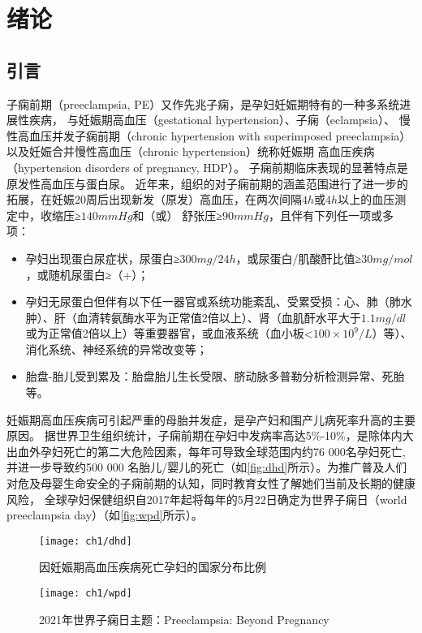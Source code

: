\chapter{绪论}

\section{引言}
子痫前期（preeclampsia, PE）又作先兆子痫，是孕妇妊娠期特有的一种多系统进展性疾病， 与妊娠期高血压（gestational hypertension）、子痫（eclampsia）、
慢性高血压并发子痫前期（chronic hypertension with superimposed preeclampsia）以及妊娠合并慢性高血压（chronic hypertension）统称妊娠期
高血压疾病（hypertension disorders of pregnancy, HDP）\cite{OAG9,HDASOM,2000s1}。
子痫前期临床表现的显著特点是原发性高血压与蛋白尿。
近年来，组织的对子痫前期的涵盖范围进行了进一步的拓展，在妊娠20周后出现新发（原发）高血压，在两次间隔$4h$或$4h$以上的血压测定中，收缩压≥$140mmHg$和（或）
舒张压≥$90mmHg$，且伴有下列任一项或多项\cite{OAG9,FIGO}：
\begin{itemize}
    \item 孕妇出现蛋白尿症状，尿蛋白≥$300mg/24h$，或尿蛋白/肌酸酐比值≥$30mg/mol$，或随机尿蛋白≥（+）；
    \item 孕妇无尿蛋白但伴有以下任一器官或系统功能紊乱、受累受损：心、肺（肺水肿）、肝（血清转氨酶水平为正常值2倍以上）、肾（血肌酐水平大于$1.1mg/dl$
    或为正常值2倍以上）等重要器官，或血液系统（血小板<$100 \times 10^{9}/L$）等）、消化系统、神经系统的异常改变等；
    \item 胎盘-胎儿受到累及：胎盘胎儿生长受限、脐动脉多普勒分析检测异常、死胎等。 
\end{itemize}

妊娠期高血压疾病可引起严重的母胎并发症，是孕产妇和围产儿病死率升高的主要原因\cite{OAG9}。
据世界卫生组织统计，子痫前期在孕妇中发病率高达5\%-10\%，是除体内大出血外孕妇死亡的第二大危险因素\cite{LCT2006}，每年可导致全球范围内约76 000名孕妇死亡,并进一步导致约500 000
名胎儿/婴儿的死亡\cite{DAM2015,LCT2006}（如\autoref{fig:dhd}所示）。为推广普及人们对危及母婴生命安全的子痫前期的认知，同时教育女性了解她们当前及长期的健康风险，
全球孕妇保健组织自2017年起将每年的5月22日确定为世界子痫日（world preeclampsia day）（如\autoref{fig:wpd}所示）。
\begin{figure}[h]
    \centering
    \texttt{[image: ch1/dhd]}
    \caption{\label{fig:dhd}因妊娠期高血压疾病死亡孕妇的国家分布比例}
\end{figure}
\begin{figure}[h]
    \centering
    \texttt{[image: ch1/wpd]}
    \caption{\label{fig:wpd}2021年世界子痫日主题：Preeclampsia: Beyond Pregnancy}
\end{figure}

